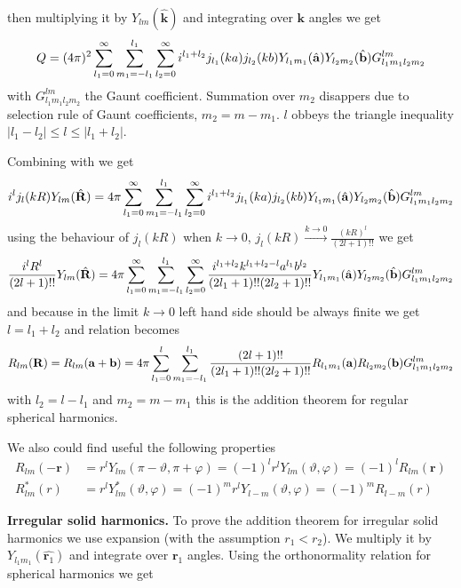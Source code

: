 then multiplying it by $Y_{lm}(\hat{\bm{k}})$
and integrating over $\bm{k}$ angles we get
\begin{equation}
\label{p2}
Q=(4\pi)^2
\sum_{l_1=0}^{\infty}\sum_{m_1=-l_1}^{l_1}\sum_{l_2=0}^{\infty}i^{l_1+l_2}j_{l_1}(ka)j_{l_2}(kb)Y_{l_1m_1}(\hat{\bf a})Y_{l_2m_2}(\hat{\bf b})G_{l_1m_1l_2m_2}^{lm}
\end{equation}
with $G_{l_1m_1l_2m_2}^{lm}$ the Gaunt coefficient. Summation over $m_2$
disappers due to selection rule of Gaunt coefficients, $m_2=m-m_1$. $l$
obbeys the triangle inequality $|l_1-l_2|\le l\le |l_1+l_2|$. 
\par{Combining  with  we get}
\begin{equation}
i^lj_l(kR)Y_{lm}(\hat{\bf R})=4\pi\sum_{l_1=0}^{\infty}\sum_{m_1=-l_1}^{l_1}\sum_{l_2=0}^{\infty}i^{l_1+l_2}j_{l_1}(ka)j_{l_2}(kb)Y_{l_1m_1}(\hat{\bf a})Y_{l_2m_2}(\hat{\bf b})G_{l_1m_1l_2m_2}^{lm}
\end{equation}
using the behaviour of $j_l(kR)$ when $k\rightarrow 0$,
$j_l(kR)\xrightarrow{k\rightarrow 0}\frac{(kR)^l}{(2l+1)!!}$ we get
\begin{equation}
\frac{i^lR^{l}}{(2l+1)!!}Y_{lm}(\hat{\bf R})=4\pi\sum_{l_1=0}^{\infty}\sum_{m_1=-l_1}^{l_1}\sum_{l_2=0}^{\infty}\frac{i^{l_1+l_2}k^{l_1+l_2-l}a^{l_1}b^{l_2}}{(2l_1+1)!!(2l_2+1)!!}Y_{l_1m_1}(\hat{\bf a})Y_{l_2m_2}(\hat{\bf b})G_{l_1m_1l_2m_2}^{lm}
\end{equation}
and because in the limit  $k\rightarrow 0$ left hand side should be always
finite we get $l=l_1+l_2$ and relation becomes
\begin{equation*}
R_{lm}({\bf R})=R_{lm}({\bf a}+{\bf b})=4\pi\sum_{l_1=0}^{l}\sum_{m_1=-l_1}^{l_1}\frac{(2l+1)!!}{(2l_1+1)!!(2l_2+1)!!}R_{l_1m_1}({\bf a})R_{l_2m_2}({\bf b})G_{l_1m_1l_2m_2}^{lm}    
\end{equation*}
with $l_2=l-l_1$ and $m_2=m-m_1$ this is the addition theorem for regular
spherical harmonics.
\par{We also could find useful the following properties}
\begin{equation}
\begin{split}
R_{lm}(-\bm{r})&=r^lY_{lm}(\pi
-\vartheta,\pi+\varphi)=(-1)^{l}r^lY_{lm}(\vartheta,\varphi)=(-1)^lR_{lm}(\bm{r})\\
R_{lm}^{*}(r)&=r^lY_{lm}^{*}(\vartheta,\varphi)=(-1)^mr^lY_{l-m}(\vartheta,\varphi)=(-1)^mR_{l-m}(r)
\end{split}
\end{equation}
\par{\textbf{Irregular solid harmonics.} To prove the addition theorem for irregular solid harmonics we use
  expansion (with the assumption $r_1<r_2$). We multiply it by
  $Y_{l_1m_1}(\hat{\bm{r}_1})$ and integrate over $\bm{r}_1$ angles. Using the
  orthonormality relation for spherical harmonics we get}
